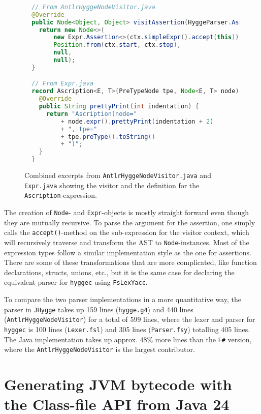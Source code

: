 \begin{figure}[H]
\centering 
\begin{lstlisting}[language=Java]
 
  // From AntlrHyggeNodeVisitor.java
  @Override
  public Node<Object, Object> visitAssertion(HyggeParser.AssertionContext ctx) {
    return new Node<>(
        new Expr.Assertion<>(ctx.simpleExpr().accept(this)),
        Position.from(ctx.start, ctx.stop),
        null,
        null);
  }

  // From Expr.java
  record Ascription<E, T>(PreTypeNode tpe, Node<E, T> node) implements Expr<E, T> {
    @Override
    public String prettyPrint(int indentation) {
      return "Ascription(node="
          + node.expr().prettyPrint(indentation + 2)
          + ", tpe="
          + tpe.preType().toString()
          + ")";
    }
  }

\end{lstlisting}
\caption{Combined excerpts from \texttt{AntlrHyggeNodeVisitor.java} and \texttt{Expr.java} showing the visitor and the definition for the \texttt{Ascription}-expression. }
\label{fig:antlr_node_visitor}
\end{figure}

The creation of \texttt{Node}- and \texttt{Expr}-objects is mostly straight forward even though they are mutually recursive.
To parse the argument for the assertion, one simply calls the \texttt{accept()}-method on the sub-expression for the visitor
context, which will recursively traverse and transform the AST to \texttt{Node}-instances. Most of the expression types
follow a similar implementation style as the one for assertions. There are some of these transformations that are more complicated,
like function declarations, structs, unions, etc., but it is the same case for declaring the equivalent parser for \texttt{hyggec}
using \texttt{FsLexYacc}.

To compare the two parser implementations in a more quantitative way, the parser in \texttt{JHygge}
takes up 159 lines (\texttt{hygge.g4}) and 440 lines (\texttt{AntlrHyggeNodeVisitor}) for a total of 599 lines, where the lexer and
parser for \texttt{hyggec} is 100 lines (\texttt{Lexer.fsl}) and 305 lines (\texttt{Parser.fsy}) totalling 405 lines. The Java
implementation takes up approx. $48\%$ more lines than the \texttt{F\#} version, where the \texttt{AntlrHyggeNodeVisitor} is
the largest contributor.

\section{Generating JVM bytecode with the Class-file API from Java 24} \label{sec:codegen}

